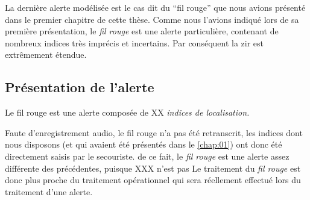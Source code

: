 
La dernière alerte modélisée est le cas dit du \enquote{fil rouge} que
nous avions présenté dans le premier chapitre de cette thèse. Comme
nous l'avions indiqué lors de sa première présentation, le \emph{fil
  rouge} est une alerte particulière, contenant de nombreux indices
très imprécis et incertains. Par conséquent la \ac{zir} est
extrêmement étendue.


\subsection{Présentation de l'alerte}
\label{subsec:9-4-1}

Le fil rouge est une alerte composée de XX \emph{indices de
  localisation.}


Faute d'enregistrement audio, le fil rouge n'a pas été retranscrit,
les indices dont nous disposons (et qui avaient été présentés dans le
\autoref{chap:01}) ont donc été directement saisis par le secouriste.
%
de ce fait, le \emph{fil rouge} est une alerte assez différente des
précédentes, puisque XXX n'est pas
%
Le traitement du \emph{fil rouge} est donc plus proche du traitement
opérationnel qui sera réellement effectué lors du traitement d'une
alerte.


